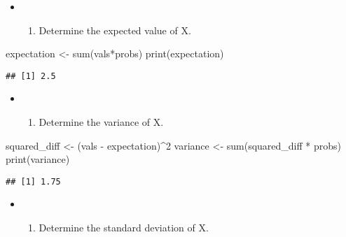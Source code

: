 \documentclass[
]{article}
\newenvironment{Shaded}{\begin{snugshade}}{\end{snugshade}}
\newcommand{\DecValTok}[1]{\textcolor[rgb]{0.00,0.00,0.81}{#1}}
\newcommand{\FunctionTok}[1]{\textcolor[rgb]{0.00,0.00,0.00}{#1}}
\newcommand{\NormalTok}[1]{#1}
\newcommand{\OtherTok}[1]{\textcolor[rgb]{0.56,0.35,0.01}{#1}}
\newcommand{\SpecialCharTok}[1]{\textcolor[rgb]{0.00,0.00,0.00}{#1}}
\providecommand{\tightlist}{%
  \setlength{\itemsep}{0pt}\setlength{\parskip}{0pt}}
\begin{document}
\hfill\break

\begin{itemize}
\item
  \begin{enumerate}
  \def\labelenumi{\alph{enumi})}
  \setcounter{enumi}{2}
  \tightlist
  \item
    Determine the expected value of X.
  \end{enumerate}
\end{itemize}

\begin{Shaded}
\begin{Highlighting}[]
\NormalTok{expectation }\OtherTok{\textless{}{-}} \FunctionTok{sum}\NormalTok{(vals}\SpecialCharTok{*}\NormalTok{probs)}
\FunctionTok{print}\NormalTok{(expectation)}
\end{Highlighting}
\end{Shaded}

\begin{verbatim}
## [1] 2.5
\end{verbatim}

\hfill\break

\begin{itemize}
\item
  \begin{enumerate}
  \def\labelenumi{\alph{enumi})}
  \setcounter{enumi}{3}
  \tightlist
  \item
    Determine the variance of X.
  \end{enumerate}
\end{itemize}

\begin{Shaded}
\begin{Highlighting}[]
\NormalTok{squared\_diff }\OtherTok{\textless{}{-}}\NormalTok{ (vals }\SpecialCharTok{{-}}\NormalTok{ expectation)}\SpecialCharTok{\^{}}\DecValTok{2}
\NormalTok{variance }\OtherTok{\textless{}{-}} \FunctionTok{sum}\NormalTok{(squared\_diff }\SpecialCharTok{*}\NormalTok{ probs)}
\FunctionTok{print}\NormalTok{(variance)}
\end{Highlighting}
\end{Shaded}

\begin{verbatim}
## [1] 1.75
\end{verbatim}

\hfill\break

\begin{itemize}
\item
  \begin{enumerate}
  \def\labelenumi{\alph{enumi})}
  \setcounter{enumi}{4}
  \tightlist
  \item
    Determine the standard deviation of X.
  \end{enumerate}
\end{itemize}
\end{document}
